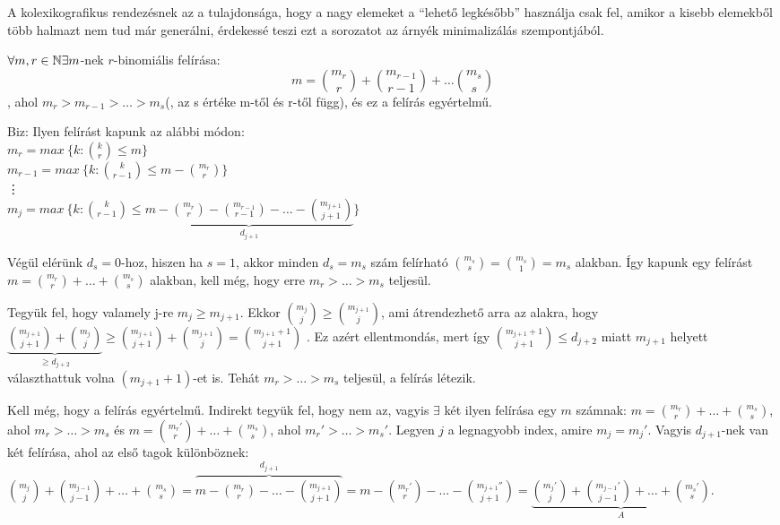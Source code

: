 \medskip

A kolexikografikus rendezésnek az a tulajdonsága, hogy a nagy elemeket a ``lehető legkésőbb'' használja csak fel, amikor a kisebb elemekből több halmazt nem tud már generálni, érdekessé teszi ezt a sorozatot az árnyék minimalizálás szempontjából.

\begin{thm}
  $\forall m, r \in \mathbb{N} \exists m$-nek $r$-binomiális felírása:
  \[m = \binom{m_r}{r} + \binom{m_{r-1}}{r-1} + \dots \binom{m_s}{s}\], ahol $m_r > m_{r-1} > \dots > m_s$(, az s értéke m-től és r-től függ), és ez a felírás egyértelmű.
\end{thm}

\begin{samepage} %
  Biz: Ilyen felírást kapunk az alábbi módon: \\
  $m_r = max~\{k: \binom{k}{r} \leq m\}$ \\
  $m_{r-1} = max~\{k: \binom{k}{r-1} \leq m - \binom{m_r}{r}\}$ \\
  \vdots \\
  $m_j = max~\{k: \binom{k}{r-1} \leq \underbrace{m - \binom{m_r}{r} - \binom{m_{r-1}}{r-1} - \dots - \binom{m_{j+1}}{j+1}}_{d_{j+1}}\}$
\end{samepage}

Végül elérünk $d_s = 0$-hoz, hiszen ha $s=1$, akkor minden $d_s = m_s$ szám felírható $\binom{m_s}{s} = \binom{m_s}{1} = m_s$ alakban. Így kapunk egy felírást $m = \binom{m_r}{r} + \dots + \binom{m_s}{s}$ alakban, kell még, hogy erre $m_r > \dots > m_s$ teljesül.

\bigskip

Tegyük fel, hogy valamely j-re $m_j \geq m_{j+1}$. Ekkor $\binom{m_j}{j} \geq \binom{m_{j+1}}{j}$, ami átrendezhető arra az alakra, hogy $\underbrace{\binom{m_{j+1}}{j+1} + \binom{m_j}{j}}_{\geq d_{j+2}} \geq \binom{m_{j+1}}{j+1} + \binom{m_{j+1}}{j} = \binom{m_{j+1} + 1}{j+1}$ \Lightning. Ez azért ellentmondás, mert így $\binom{m_{j+1}+1}{j+1} \leq d_{j+2}$ miatt $m_{j+1}$ helyett választhattuk volna $(m_{j+1} + 1)$-et is. Tehát $m_r > \dots > m_s$ teljesül, a felírás létezik.

\bigskip

Kell még, hogy a felírás egyértelmű. Indirekt tegyük fel, hogy nem az, vagyis $\exists$ két ilyen felírása egy $m$ számnak: $m = \binom{m_r}{r} + \dots + \binom{m_s}{s}$, ahol $m_r > \dots > m_s$ és $m = \binom{m_r'}{r} + \dots + \binom{m_s}{s}$, ahol $m_r' > \dots > m_s'$. Legyen $j$ a legnagyobb index, amire $m_j = m_j'$. Vagyis $d_{j+1}$-nek van két felírása, ahol az első tagok különböznek: $\binom{m_j}{j} + \binom{m_{j-1}}{j-1} + \dots + \binom{m_s}{s} = \overbrace{m - \binom{m_r}{r} - \dots - \binom{m_{j+1}}{j+1}}^{d_{j+1}} = m - \binom{m_r'}{r} - \dots - \binom{m_{j+1}''}{j+1} = \underbrace{\binom{m_j'}{j} + \binom{m_{j-1}'}{j-1} + \dots + \binom{m_s'}{s}}_{A}$.

